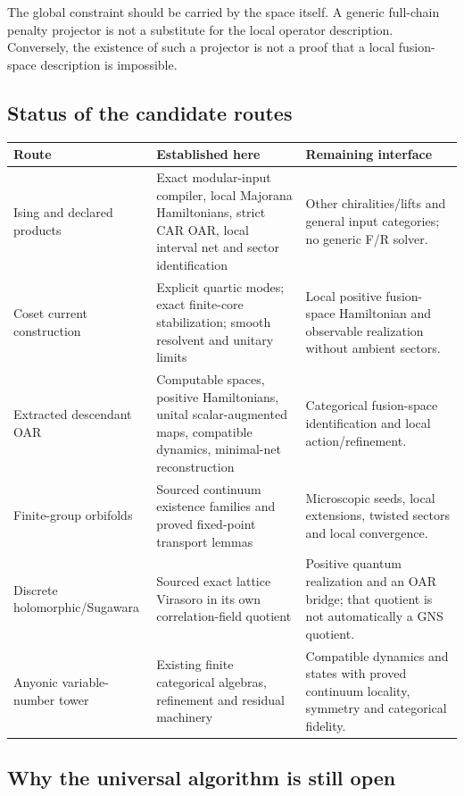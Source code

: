 The global constraint should be carried by the space itself. A generic
full-chain penalty projector is not a substitute for the local operator
description. Conversely, the existence of such a projector is not a proof
that a local fusion-space description is impossible.

\subsection{Status of the candidate routes}

\begin{longtable}{@{}p{}p{}p{}@{}}
\toprule
Route & Established here & Remaining interface\\\midrule
Ising and declared products & Exact modular-input compiler, local Majorana
Hamiltonians, strict CAR OAR, local interval net and sector identification &
Other chiralities/lifts and general input categories; no generic F/R solver.\\
Coset current construction & Explicit quartic modes; exact finite-core
stabilization; smooth resolvent and unitary limits & Local positive
fusion-space Hamiltonian and observable realization without ambient sectors.\\
Extracted descendant OAR & Computable spaces, positive Hamiltonians,
unital scalar-augmented maps, compatible dynamics, minimal-net reconstruction &
Categorical fusion-space identification and local action/refinement.\\
Finite-group orbifolds & Sourced continuum existence families and proved
fixed-point transport lemmas & Microscopic seeds, local extensions,
twisted sectors and local convergence.\\
Discrete holomorphic/Sugawara & Sourced exact lattice Virasoro in its own
correlation-field quotient & Positive quantum realization and an OAR bridge;
that quotient is not automatically a GNS quotient.\\
Anyonic variable-number tower & Existing finite categorical algebras,
refinement and residual machinery & Compatible dynamics and states with
proved continuum locality, symmetry and categorical fidelity.\\
\bottomrule
\end{longtable}

\subsection{Why the universal algorithm is still open}

